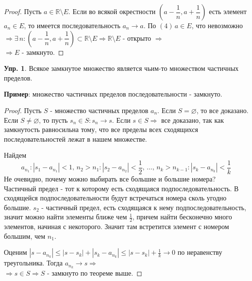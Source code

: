 \documentclass[12pt]{article}
\theoremstyle{definition}
\newtheorem{exrc}{Упр.}
\begin{document}
\begin{proof}
	Пусть $a \in \mathbb{R}\setminus E$. Если во всякой окрестности $(a - \dfrac{1}{n}, a + \dfrac{1}{n})$ есть элемент $a_n \in E$, то имеется последовательность $a_n \to a$. По $(4) \, a \in E$, что невозможно $\Rightarrow \exists \, n \colon (a - \dfrac{1}{n}, a + \dfrac{1}{n}) \subset \mathbb{R} \setminus E \Rightarrow \mathbb{R} \setminus E$ - открыто $\Rightarrow$ \\
	$\Rightarrow E$ - замкнуто.
\end{proof}

\begin{exrc}
	Всякое замкнутое множество является чьим-то множеством частичных пределов.
\end{exrc}

\textbf{Пример}: множество частичных пределов последовательности - замкнуто.

\begin{proof}
	Пусть $S$ - множество частичных пределов $a_n$. Если $S = \varnothing$, то все доказано. Если $S \neq \varnothing$, то пусть $s_n \in S \colon s_n \to s$. Если $s \in S \Rightarrow$ все доказано, так как замкнутость равносильна тому, что все пределы всех сходящихся последовательностей лежат в нашем множестве.
	
	Найдем 
	$$a_{n_1} \colon |s_1 - a_{n_1}| < 1, \, n_2 > n_1 \colon |s_2 - a_{n_2}| < \frac{1}{2}, \, \dotsc , \,n_k  > n_{k-1} \colon |s_k - a_{n_k}| < \frac{1}{k}$$ 
	Не очевидно, почему можно выбирать все большие и большие номера? Частичный предел - тот к которому есть сходящаяся подпоследовательность. В сходящейся подпоследовательности будут встречаться номера сколь угодно большие. $s_2$ - частичный предел, есть сходящаяся к нему подпоследовательность, значит можно найти элементы ближе чем $\frac{1}{2}$, причем найти бесконечно много элементов, начиная с некоторого. Значит там встретится элемент с номером большим, чем $n_1$.
	
	Оценим $|s - a_{n_k}| \leq |s - s_k| + |s_k - a_{n_k}| \leq |s - s_k| + \frac{1}{k} \to 0$ по неравенству треугольника. Тогда $a_{n_k} \to s \Rightarrow$\\ $\Rightarrow s \in S \Rightarrow S$ - замкнуто по теореме выше.
\end{proof}
\end{document}
